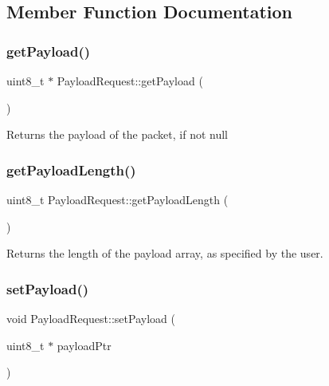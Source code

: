 \subsection{Member Function Documentation}
\hypertarget{class_payload_request_a1e2d5757fefda70dfd0c567b3dd0ba39}{}\label{class_payload_request_a1e2d5757fefda70dfd0c567b3dd0ba39} 
\subsubsection{\texorpdfstring{get\+Payload()}{getPayload()}}
{\footnotesize\ttfamily uint8\+\_\+t $\ast$ Payload\+Request\+::get\+Payload (\begin{DoxyParamCaption}{ }\end{DoxyParamCaption})}

Returns the payload of the packet, if not null \hypertarget{class_payload_request_afb718d069f05611623833437c99893a4}{}\label{class_payload_request_afb718d069f05611623833437c99893a4} 
\subsubsection{\texorpdfstring{get\+Payload\+Length()}{getPayloadLength()}}
{\footnotesize\ttfamily uint8\+\_\+t Payload\+Request\+::get\+Payload\+Length (\begin{DoxyParamCaption}{ }\end{DoxyParamCaption})}

Returns the length of the payload array, as specified by the user. \hypertarget{class_payload_request_aa9abc1f496a1c457f796207aa8a7567d}{}\label{class_payload_request_aa9abc1f496a1c457f796207aa8a7567d} 
\subsubsection{\texorpdfstring{set\+Payload()}{setPayload()}}
{\footnotesize\ttfamily void Payload\+Request\+::set\+Payload (\begin{DoxyParamCaption}\item[{uint8\+\_\+t $\ast$}]{payload\+Ptr }\end{DoxyParamCaption})}

